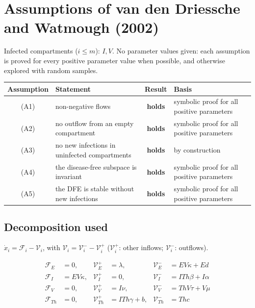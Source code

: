 \documentclass{article}
\begin{document}
\section*{Assumptions of van den Driessche and Watmough (2002)}

Infected compartments ($i \le m$): $I, V$. No parameter values given: each assumption is proved for every positive parameter value when possible, and otherwise explored with random samples.

\begin{center}
\begin{tabular}{c p{} c p{}}
\hline
Assumption & Statement & Result & Basis \\
\hline
(A1) & non-negative flows & \textbf{holds} & symbolic proof for all positive parameters \\
(A2) & no outflow from an empty compartment & \textbf{holds} & symbolic proof for all positive parameters \\
(A3) & no new infections in uninfected compartments & \textbf{holds} & by construction \\
(A4) & the disease-free subspace is invariant & \textbf{holds} & symbolic proof for all positive parameters \\
(A5) & the DFE is stable without new infections & \textbf{holds} & symbolic proof for all positive parameters \\
\hline
\end{tabular}
\end{center}

\subsection*{Decomposition used}

$\dot x_i = \mathcal{F}_i - \mathcal{V}_i$, with $\mathcal{V}_i = \mathcal{V}_i^- - \mathcal{V}_i^+$ ($\mathcal{V}_i^+$: other inflows; $\mathcal{V}_i^-$: outflows).

\begin{align*}
\mathcal{F}_{E} &= 0, & \mathcal{V}_{E}^+ &= \lambda, & \mathcal{V}_{E}^- &= E V \kappa + E d \\
\mathcal{F}_{I} &= E V \kappa, & \mathcal{V}_{I}^+ &= 0, & \mathcal{V}_{I}^- &= I Th \beta + I \alpha \\
\mathcal{F}_{V} &= 0, & \mathcal{V}_{V}^+ &= I \nu, & \mathcal{V}_{V}^- &= Th V \tau + V \mu \\
\mathcal{F}_{Th} &= 0, & \mathcal{V}_{Th}^+ &= I Th \gamma + b, & \mathcal{V}_{Th}^- &= Th c
\end{align*}
\end{document}
